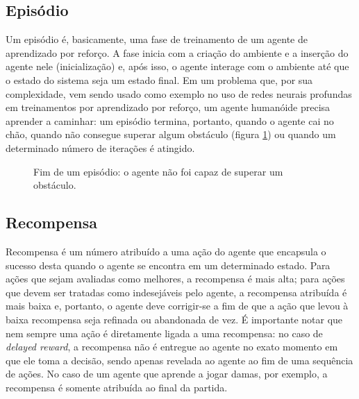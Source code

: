 \documentclass[cic,tc]{iiufrgs}
\begin{document}
\subsection{Episódio}
  Um episódio é, basicamente, uma fase de treinamento de um agente de aprendizado por reforço. A fase inicia com a criação do ambiente e a inserção
  do agente nele (inicialização) e, após isso, o agente interage com o ambiente até que o estado do sistema seja um estado final. Em um problema que,
  por sua complexidade, vem sendo usado como exemplo no uso de redes neurais profundas em treinamentos por aprendizado por reforço, um agente humanóide
  precisa aprender a caminhar: um episódio termina, portanto, quando o agente cai no chão, quando não consegue superar algum obstáculo (figura \ref{fig:walkingrobot})
  ou quando um determinado número de iterações é atingido.
  \begin{figure}
      \caption{Fim de um episódio: o agente não foi capaz de superar um obstáculo.}
      \begin{center}
      \end{center}
      \label{fig:walkingrobot}
  \end{figure}

\subsection{Recompensa}

Recompensa é um número atribuído a uma ação do agente que encapsula o sucesso desta quando o agente se encontra em um determinado estado. Para ações que
 sejam avaliadas como melhores, a recompensa é mais alta;
para ações que devem ser tratadas como indesejáveis pelo agente, a recompensa atribuída é mais baixa e, portanto, o agente deve corrigir-se a fim de que
a ação que levou à baixa recompensa seja refinada ou abandonada de vez. É importante notar que nem sempre uma ação é diretamente ligada a uma recompensa:
no caso de \textit{delayed reward}, a recompensa não é entregue ao agente no exato momento em que ele toma a decisão, sendo apenas revelada ao agente ao fim
de uma sequência de ações. No caso de um
agente que aprende a jogar damas, por exemplo, a recompensa é somente atribuída ao final da partida.
\end{document}
